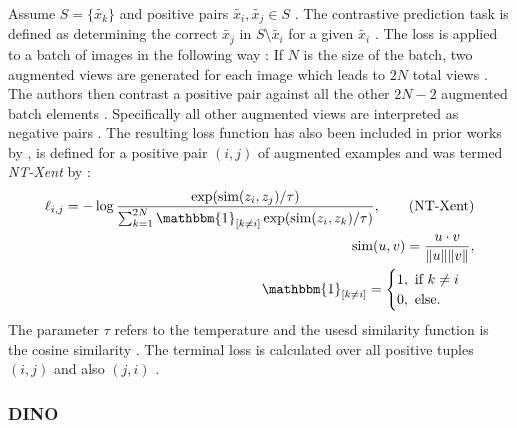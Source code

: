 Assume $S=\{{\tilde{x_k}}\}$ and positive pairs $\tilde{x_i}, \tilde{x_j} \in S$ \citep{Chen2020}.
The contrastive prediction task is defined as determining the correct $\tilde{x_j}$ in $S\setminus \tilde{x_i}$ for a given $\tilde{x_i}$ \citep{Chen2020}.
The loss is applied to a batch of images in the following way \citep{Chen2020}:
If $N$ is the size of the batch, two augmented views are generated for each image which leads to $2N$ total views \citep{Chen2020}.
The authors then contrast a positive pair against all the other $2N-2$ augmented batch elements \citep{Chen2020}.
Specifically all other augmented views are interpreted as negative pairs \citep{Chen2020}.
The resulting loss function has also been included in prior works by \citep{Sohn2016,Wu2018,Oord2018}, is defined for a positive pair $(i,j)$ of augmented examples and was termed \textit{NT-Xent} by \citep{Chen2017}:
\begin{align}
	\ell_{i,j} = -\log\frac{\exp(\text{sim}(z_i,z_j)/\tau)}{\sum_{k=1}^{2N} \mathbbm{1}_{[k \neq i]}\exp(\text{sim}(z_i,z_k)/\tau)}, \tag{NT-Xent}\\
	\text{sim}(u,v) = \frac{u\cdot v}{\Vert u \Vert \Vert v \Vert}, \\
	\mathbbm{1}_{[k \neq i]} = \begin{cases}
		1, \text{ if } k \neq i \\
		0, \text{ else}.
	\end{cases}
\end{align}
The parameter $\tau$ refers to the temperature and the usesd similarity function is the cosine similarity \citep{Chen2020}.
The terminal loss is calculated over all positive tuples $(i,j)$ and also $(j,i)$ \citep{Chen2020}.
\subsubsection{DINO}
